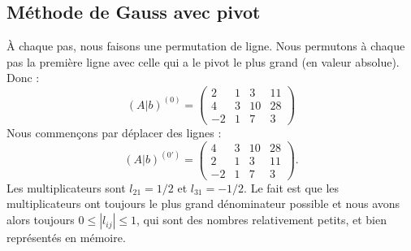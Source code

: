 \subsection{Méthode de Gauss avec pivot}

À chaque pas, nous faisons une permutation de ligne. Nous permutons à chaque pas la première ligne avec celle qui a le pivot le plus grand (en valeur absolue). Donc :
\begin{equation}
    (A|b)^{(0)}=\begin{pmatrix}
         2   &   1    &   3    &   11    \\
         4   &   3    &   10    &   28    \\ 
         -2   &   1    &   7    &   3
     \end{pmatrix}
\end{equation}
Nous commençons par déplacer des lignes :
\begin{equation}
    (A|b)^{(0')}=\begin{pmatrix}
         4   &   3    &   10    &   28    \\ 
         2   &   1    &   3    &   11    \\
         -2   &   1    &   7    &   3
     \end{pmatrix}.
\end{equation}
Les multiplicateurs sont \( l_{21}=1/2\) et \( l_{31}=-1/2\). Le fait est que les multiplicateurs ont toujours le plus grand dénominateur possible et nous avons alors toujours \( 0\leq | l_{ij} |\leq 1\), qui sont des nombres relativement petits, et bien représentés en mémoire.

